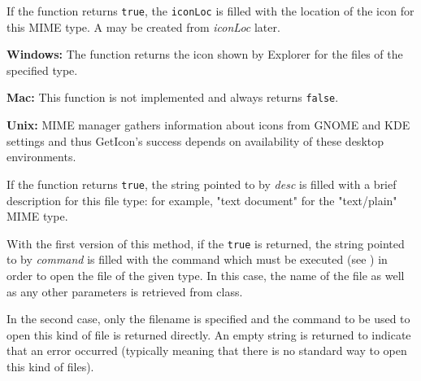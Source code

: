 \label{wxfiletypegeticon}


If the function returns {\tt true}, the {\tt iconLoc} is filled with the
location of the icon for this MIME type. A  may be
created from {\it iconLoc} later.

{\bf Windows:} The function returns the icon shown by Explorer for the files of
the specified type.

{\bf Mac:} This function is not implemented and always returns {\tt false}.

{\bf Unix:} MIME manager gathers information about icons from GNOME
and KDE settings and thus GetIcon's success depends on availability
of these desktop environments.

\label{wxfiletypegetdescription}


If the function returns {\tt true}, the string pointed to by {\it desc} is filled
with a brief description for this file type: for example, "text document" for
the "text/plain" MIME type.

\label{wxfiletypegetopencommand}



With the first version of this method, if the {\tt true} is returned, the
string pointed to by {\it command} is filled with the command which must be
executed (see ) in order to open the file of the
given type. In this case, the name of the file as well as any other parameters
is retrieved from  
class.

In the second case, only the filename is specified and the command to be used
to open this kind of file is returned directly. An empty string is returned to
indicate that an error occurred (typically meaning that there is no standard way
to open this kind of files).

\label{wxfiletypegetprintcommand}


